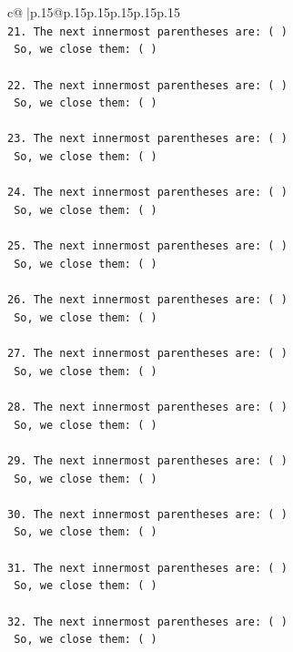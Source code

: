 \documentclass{article}
\begin{document}
{\begin{supertabular}{c@{$\;$}|p{.15\linewidth}@{}p{.15\linewidth}p{.15\linewidth}p{.15\linewidth}p{.15\linewidth}p{.15\linewidth}}
{{{\\ 
\texttt{21. The next innermost parentheses are: ( ) } \\
\texttt{    So, we close them: ( ) } \\
\\ 
\texttt{22. The next innermost parentheses are: ( ) } \\
\texttt{    So, we close them: ( ) } \\
\\ 
\texttt{23. The next innermost parentheses are: ( ) } \\
\texttt{    So, we close them: ( ) } \\
\\ 
\texttt{24. The next innermost parentheses are: ( ) } \\
\texttt{    So, we close them: ( ) } \\
\\ 
\texttt{25. The next innermost parentheses are: ( ) } \\
\texttt{    So, we close them: ( ) } \\
\\ 
\texttt{26. The next innermost parentheses are: ( ) } \\
\texttt{    So, we close them: ( ) } \\
\\ 
\texttt{27. The next innermost parentheses are: ( ) } \\
\texttt{    So, we close them: ( ) } \\
\\ 
\texttt{28. The next innermost parentheses are: ( ) } \\
\texttt{    So, we close them: ( ) } \\
\\ 
\texttt{29. The next innermost parentheses are: ( ) } \\
\texttt{    So, we close them: ( ) } \\
\\ 
\texttt{30. The next innermost parentheses are: ( ) } \\
\texttt{    So, we close them: ( ) } \\
\\ 
\texttt{31. The next innermost parentheses are: ( ) } \\
\texttt{    So, we close them: ( ) } \\
\\ 
\texttt{32. The next innermost parentheses are: ( ) } \\
\texttt{    So, we close them: ( ) } \\
}}}
\end{supertabular}}
\end{document}
